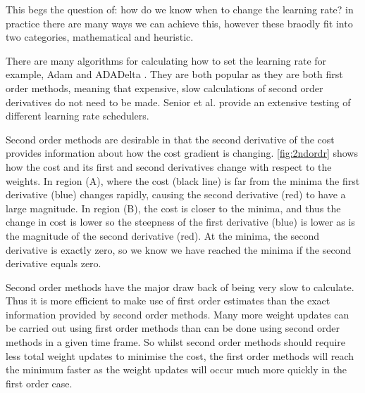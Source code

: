 This begs the question of: how do we know when to change the learning rate? in  practice there are many ways we can achieve this, however these braodly fit into two categories, mathematical and heuristic.

There are many algorithms for calculating how to set the learning rate for example, Adam \cite{kingma2014adam} and ADADelta \cite{zeiler2012adadelta}. They are both popular as they are both first order methods, meaning that expensive, slow calculations of second order derivatives do not need to be made.
Senior et al.\cite{senior2013empirical} provide an extensive testing of different learning rate schedulers. 

Second order methods are desirable in that the second derivative of the cost provides information about how the cost gradient is changing. \autoref{fig:2ndordr} shows how the cost and its first and second derivatives change with respect to the weights. In region (A), where the cost (black line) is far from the minima the first derivative (blue) changes rapidly, causing the second derivative (red) to have a large magnitude. In region (B), the cost is closer to the minima, and thus the change in cost is lower so the steepness of the first derivative (blue) is lower as is the magnitude of the second derivative (red). At the minima, the second derivative is exactly zero, so we know we have reached the minima if the second derivative equals zero.

Second order methods have the major draw back of being very slow to calculate. Thus it is more efficient to make use of first order estimates than the exact information provided by second order methods. Many more weight updates can be carried out using first order methods than can be done using second order methods in a given time frame. So whilst second order methods should require less total weight updates to minimise the cost, the first order methods will reach the minimum faster as the weight updates will occur much more quickly in the first order case.


